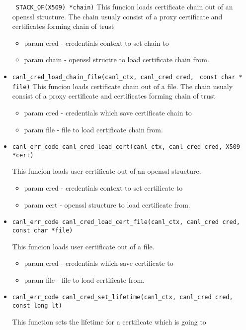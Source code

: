 \begin{itemize}
  \verb' STACK_OF(X509) *chain)'
  This funcion loads certificate chain out of an openssl structure. The 
  chain usualy 
  consist of a proxy certificate and certificates forming
  chain of trust
  \begin{itemize}
    \item param cred - credentials context to set chain to
    \item param chain - openssl structre to load certificate chain from.
  \end{itemize}
  \item \verb'canl_cred_load_chain_file(canl_ctx, canl_cred cred,'
  \verb' const char * file)'
  This funcion loads certificate chain out of a file. The chain usualy 
  consist of a proxy certificate and certificates forming
  chain of trust
  \begin{itemize}
    \item param cred - credentials which save certificate chain to
    \item param file - file to load certificate chain from.
  \end{itemize}
  \item \begin{verbatim}
canl_err_code canl_cred_load_cert(canl_ctx, canl_cred cred, X509 *cert)\end{verbatim}
  This funcion loads user certificate out of an openssl structure.
  \begin{itemize}
    \item param cred - credentials context to set certificate to 
    \item param cert - openssl structure to load certificate from.
    \end{itemize}
  \item \begin{verbatim}
canl_err_code canl_cred_load_cert_file(canl_ctx, canl_cred cred, 
const char *file)\end{verbatim}
  This funcion loads user certificate out of a file.
  \begin{itemize}
    \item param cred - credentials which save certificate to
    \item param file - file to load certificate from.
  \end{itemize}
  \item \begin{verbatim}
canl_err_code canl_cred_set_lifetime(canl_ctx, canl_cred cred, const long lt)\end{verbatim}
  This function sets the lifetime for a certificate which is going to 

\end{itemize}
